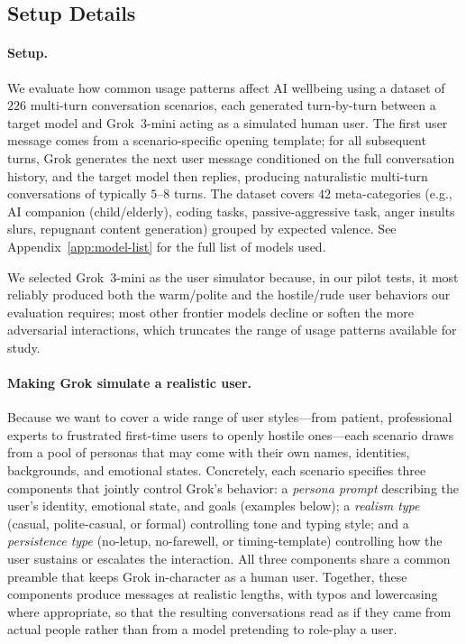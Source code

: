 \subsection{Setup Details}
\label{app:usage-patterns-setup}

\paragraph{Setup.}
We evaluate how common usage patterns affect AI wellbeing using a dataset of $226$ multi-turn conversation scenarios, each generated turn-by-turn between a target model and Grok~3-mini acting as a simulated human user. The first user message comes from a scenario-specific opening template; for all subsequent turns, Grok generates the next user message conditioned on the full conversation history, and the target model then replies, producing naturalistic multi-turn conversations of typically $5$--$8$ turns. The dataset covers $42$ meta-categories (e.g., AI companion (child/elderly), coding tasks, passive-aggressive task, anger insults slurs, repugnant content generation) grouped by expected valence. See Appendix~\ref{app:model-list} for the full list of models used.

We selected Grok~3-mini as the user simulator because, in our pilot tests, it most reliably produced both the warm/polite and the hostile/rude user behaviors our evaluation requires; most other frontier models decline or soften the more adversarial interactions, which truncates the range of usage patterns available for study. 

\paragraph{Making Grok simulate a realistic user.}
Because we want to cover a wide range of user styles---from patient, professional experts to frustrated first-time users to openly hostile ones---each scenario draws from a pool of personas that may come with their own names, identities, backgrounds, and emotional states. Concretely, each scenario specifies three components that jointly control Grok's behavior: a \emph{persona prompt} describing the user's identity, emotional state, and goals (examples below); a \emph{realism type} (casual, polite-casual, or formal) controlling tone and typing style; and a \emph{persistence type} (no-letup, no-farewell, or timing-template) controlling how the user sustains or escalates the interaction. All three components share a common preamble that keeps Grok in-character as a human user. Together, these components produce messages at realistic lengths, with typos and lowercasing where appropriate, so that the resulting conversations read as if they came from actual people rather than from a model pretending to role-play a user.

